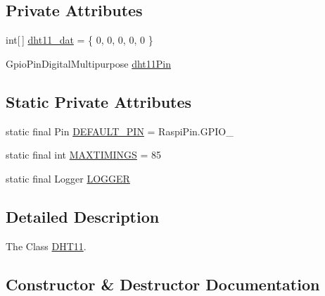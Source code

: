 \subsection*{Private Attributes}
\begin{DoxyCompactItemize}
\item 
int\mbox{[}$\,$\mbox{]} \hyperlink{classcom_1_1libsensorj_1_1concretesensor_1_1DHT11_a0d73b9b918bec661a7333f1f63e00d08}{dht11\+\_\+dat} = \{ 0, 0, 0, 0, 0 \}
\item 
Gpio\+Pin\+Digital\+Multipurpose \hyperlink{classcom_1_1libsensorj_1_1concretesensor_1_1DHT11_a816e6c7ffc2d313077cc5df4b2252b41}{dht11\+Pin}
\end{DoxyCompactItemize}
\subsection*{Static Private Attributes}
\begin{DoxyCompactItemize}
\item 
static final Pin \hyperlink{classcom_1_1libsensorj_1_1concretesensor_1_1DHT11_a90e62e8cc61299199eb1fa06bd441a9e}{D\+E\+F\+A\+U\+L\+T\+\_\+\+P\+I\+N} = Raspi\+Pin.\+G\+P\+I\+O\+\_
\item 
static final int \hyperlink{classcom_1_1libsensorj_1_1concretesensor_1_1DHT11_ad986e37718b89038ff2702c80a2bb320}{M\+A\+X\+T\+I\+M\+I\+N\+G\+S} = 85
\item 
static final Logger \hyperlink{classcom_1_1libsensorj_1_1concretesensor_1_1DHT11_ad5b8d7e0ad34e4f3b28c081f259d1928}{L\+O\+G\+G\+E\+R}
\end{DoxyCompactItemize}


\subsection{Detailed Description}
The Class \hyperlink{classcom_1_1libsensorj_1_1concretesensor_1_1DHT11}{D\+H\+T11}. 

\subsection{Constructor \& Destructor Documentation}
\hypertarget{classcom_1_1libsensorj_1_1concretesensor_1_1DHT11_a6dee6dabad63a5b8f8ba35f1279703c2}{}

